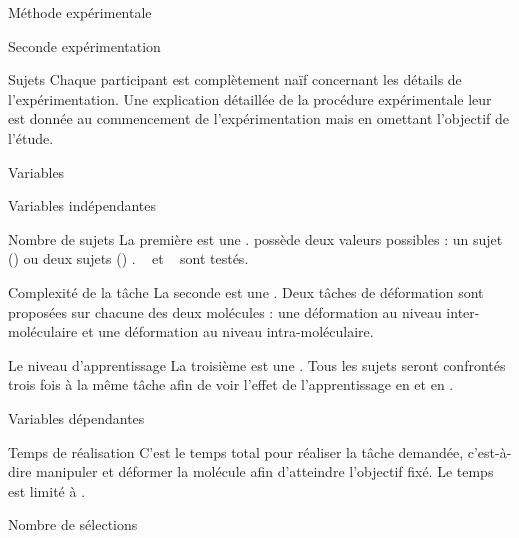 \documentclass[myfrancais]{mythesis}
\begin{document}
\begin{mychapter}{Méthode expérimentale}
\begin{mysection}{Seconde expérimentation}
\begin{mysubsection}{Sujets}
				Chaque participant est complètement naïf concernant les détails de l'expérimentation.
				Une explication détaillée de la procédure expérimentale leur est donnée au commencement de l'expérimentation mais en omettant l'objectif de l'étude.
			\end{mysubsection}
			\begin{mysubsection}{Variables}
				\begin{mysubsubsection}{Variables indépendantes}
					\begin{myparagraph}{ Nombre de sujets}
						La première  est une .
						 possède deux valeurs possibles : \og un sujet (\mycf {}) \fg ou \og deux sujets (\mycf {}) \fg.
						\mynum{12}~ et ~ sont testés.
					\end{myparagraph}
					\begin{myparagraph}{ Complexité de la tâche}
						La seconde  est une .
						Deux tâches de déformation sont proposées sur chacune des deux molécules : une déformation au niveau inter-moléculaire et une déformation au niveau intra-moléculaire.
					\end{myparagraph}
					\begin{myparagraph}{ Le niveau d'apprentissage}
						La troisième  est une .
						Tous les sujets seront confrontés trois fois à la même tâche afin de voir l'effet de l'apprentissage en  et en .
					\end{myparagraph}
				\end{mysubsubsection}
				\begin{mysubsubsection}{Variables dépendantes}
					\begin{myparagraph}{ Temps de réalisation}
						C'est le temps total pour réaliser la tâche demandée, c'est-à-dire manipuler et déformer la molécule afin d'atteindre l'objectif fixé.
						Le temps est limité à .
					\end{myparagraph}
					\begin{myparagraph}{ Nombre de sélections}

\end{myparagraph}
\end{mysubsubsection}
\end{mysubsection}
\end{mysection}
\end{mychapter}
\end{document}
